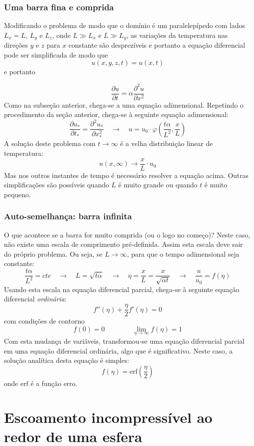 \documentclass[article,12pt,oneside,a4paper,english,brazil,sumario=tradicional]{abntex2}
\newcommand{\lra}{\ensuremath{\longrightarrow}}
\newcommand{\qrq}{\ensuremath{\quad\lra\quad}}
\newcommand{\pd}{\ensuremath{\partial}}
\begin{document}
\subsubsection{Uma barra fina e comprida}

Modificando o problema de modo que o domínio é um paralelepípedo com lados $L_x=L$, $L_y$ e $L_z$, onde $L \gg L_x$ e $L \gg L_y$, as variações da temperatura nas direções $y$ e $z$ para $x$ constante são desprezíveis e portanto a equação diferencial pode ser simplificada de modo que 
\[
u(x, y, z, t) = u(x, t)
\]
e portanto

\[
\frac{\pd u}{\pd t} = \alpha \frac{\pd^2 u}{\pd x^2}
\]
Como na subseção anterior, chega-se a uma equação adimensional. Repetindo o procedimento da seção anterior, chega-se à seguinte equação adimensional:
\[
\frac{\pd u_*}{\pd t_*} = \frac{\pd^2 u_*}{\pd x_*^2} \qrq u = u_0\cdot\varphi\left(\frac{t\alpha}{L^2}, \frac{x}{L}\right)
\]
A solução deste problema com $t\lra\infty$ é a velha distribuição linear de temperatura:
\[
u(x,\infty) \lra \frac{x}{L}\cdot u_0
\]
Mas nos outros instantes de tempo é necessário resolver a equação acima. Outras simplificações são possíveis quando $L$ é muito grande ou quando $t$ é muito pequeno.

\subsubsection{Auto-semelhança: barra infinita}
O que acontece se a barra for muito comprida (ou o logo no começo)? Neste caso, não existe uma escala de comprimento pré-definida. Assim esta escala deve sair do próprio problema. Ou seja, se $L\lra\infty$, para que o tempo adimensional seja constante:
\[
\frac{t\alpha}{L^2} = cte \qrq L = \sqrt{t\alpha} \qrq \eta = \frac{x}{L} = \frac{x}{\sqrt{\alpha t}} \qrq \frac{u}{u_0} = f(\eta)
\]
Usando esta escala na equação diferencial parcial, chega-se à seguinte equação diferencial \emph{ordinária}:
\[
f''(\eta) + \frac{\eta}{2} f'(\eta) = 0
\]
com condições de contorno
\[
f(0) = 0 \qquad\qquad \lim_{\eta\lra\infty} f(\eta) = 1
\]
Com esta mudança de variáveis, transformou-se uma equação diferencial parcial em uma equação diferencial ordinária, algo que é significativo. Neste caso, a solução analítica desta equação é simples:
\[
f(\eta) = \mathrm{erf}\left(\frac{\eta}{2}\right)
\]
onde $\mathrm{erf}$ é a função erro.

\section{Escoamento incompressível ao redor de uma esfera}
\end{document}
